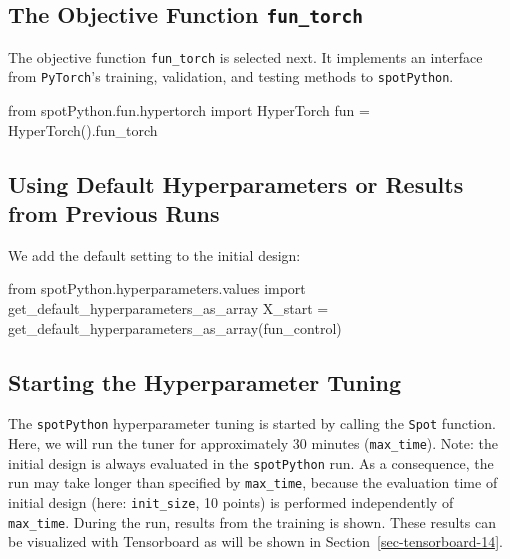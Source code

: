 \documentclass[
  letterpaper,
  DIV=11,
  numbers=noendperiod]{scrreprt}
\newenvironment{Shaded}{\begin{snugshade}}{\end{snugshade}}
\newcommand{\ImportTok}[1]{\textcolor[rgb]{0.00,0.46,0.62}{#1}}
\newcommand{\NormalTok}[1]{\textcolor[rgb]{0.00,0.23,0.31}{#1}}
\newcommand{\OperatorTok}[1]{\textcolor[rgb]{0.37,0.37,0.37}{#1}}
\begin{document}
\hypertarget{sec-the-objective-function-14}{%
\subsection{\texorpdfstring{The Objective Function
\texttt{fun\_torch}}{The Objective Function fun\_torch}}\label{sec-the-objective-function-14}}

The objective function \texttt{fun\_torch} is selected next. It
implements an interface from \texttt{PyTorch}'s training, validation,
and testing methods to \texttt{spotPython}.

\begin{Shaded}
\begin{Highlighting}[]
\ImportTok{from}\NormalTok{ spotPython.fun.hypertorch }\ImportTok{import}\NormalTok{ HyperTorch}
\NormalTok{fun }\OperatorTok{=}\NormalTok{ HyperTorch().fun\_torch}
\end{Highlighting}
\end{Shaded}

\hypertarget{sec-default-hyperparameters}{%
\subsection{Using Default Hyperparameters or Results from Previous
Runs}\label{sec-default-hyperparameters}}

We add the default setting to the initial design:

\begin{Shaded}
\begin{Highlighting}[]
\ImportTok{from}\NormalTok{ spotPython.hyperparameters.values }\ImportTok{import}\NormalTok{ get\_default\_hyperparameters\_as\_array}
\NormalTok{X\_start }\OperatorTok{=}\NormalTok{ get\_default\_hyperparameters\_as\_array(fun\_control)}
\end{Highlighting}
\end{Shaded}

\hypertarget{sec-call-the-hyperparameter-tuner-14}{%
\subsection{Starting the Hyperparameter
Tuning}\label{sec-call-the-hyperparameter-tuner-14}}

The \texttt{spotPython} hyperparameter tuning is started by calling the
\texttt{Spot} function. Here, we will run the tuner for approximately 30
minutes (\texttt{max\_time}). Note: the initial design is always
evaluated in the \texttt{spotPython} run. As a consequence, the run may
take longer than specified by \texttt{max\_time}, because the evaluation
time of initial design (here: \texttt{init\_size}, 10 points) is
performed independently of \texttt{max\_time}. During the run, results
from the training is shown. These results can be visualized with
Tensorboard as will be shown in Section~\ref{sec-tensorboard-14}.
\end{document}
